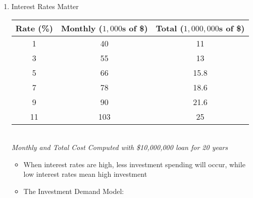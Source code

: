 \documentclass[12pt]{article}
\begin{document}
\begin{enumerate}
\begin{itemize}
\begin{itemize}
        \end{itemize}

    \end{itemize}

  \item Interest Rates Matter

    \begin{center}
      \begin{tabular}{|c|c|c|}
        \hline
        Rate (\%) & Monthly ($1,000$s of \$) & Total ($1,000,000$s of \$)\\
        \hline
        1 & 40 & 11\\
        \hline
        3 & 55 & 13\\
        \hline
        5 & 66 & 15.8\\
        \hline
        7 & 78 & 18.6\\
        \hline
        9 & 90 & 21.6\\
        \hline
        11 & 103 & 25\\
        \hline
      \end{tabular}\\
      \vspace{10pt}
      \footnotesize \textit{Monthly and Total Cost Computed with \$10,000,000 loan for 20 years}
    \end{center}

    \begin{itemize}

      \item When interest rates are high, less investment spending will occur, while low interest rates mean high investment

      \item The Investment Demand Model:

        \begin{center}


          

\end{center}
\end{itemize}
\end{enumerate}
\end{document}
